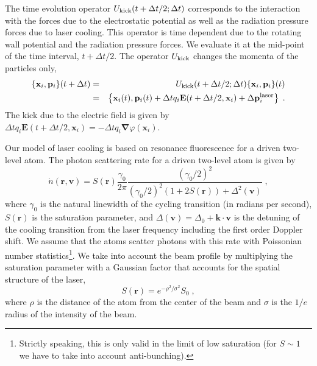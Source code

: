 \documentclass[aps, pra, twocolumn]{revtex4-1}
\begin{document}
The time evolution operator $U_{\rm kick}(t + \Delta t/2; \Delta
t)$ corresponds to the interaction with the forces due to the
electrostatic potential as well as the radiation pressure forces
due to laser cooling. This operator is time dependent due to the
rotating wall potential and the radiation pressure forces. We
evaluate it at the mid-point of the time interval, $t + \Delta t
/ 2$. The operator $U_{\rm kick}$ changes the momenta of the
particles only,
\begin{eqnarray}
  \{\mathbf{x}_i, \mathbf{p}_i\}(t + \Delta t)
  &=& U_{\rm kick}(t + \Delta t /2; \Delta t)
    \{\mathbf{x}_i, \mathbf{p}_i\}(t)\\
  &=&\left\{
      \mathbf{x}_i(t),
      \mathbf{p}_i(t) +
      \Delta t q_i \mathbf{E}(t + \Delta t / 2, \mathbf{x}_i) +
      \Delta \mathbf{p}_i^{\rm laser}
      \right\}\;.
\end{eqnarray}
The kick due to the electric field is given by $\Delta t
q_i\mathbf{E}(t+\Delta t /2,\mathbf{x}_i) = -\Delta t
q_i\mathbf{\nabla}\varphi(\mathbf{x}_i)$.

Our model of laser cooling is based on resonance fluorescence for
a driven two-level atom. The photon scattering rate for a driven
two-level atom is given by
\begin{equation}
\dot n (\mathbf{r}, \mathbf{v}) = 
S(\mathbf{r})\frac{\gamma_0}{2\pi}
\frac{(\gamma_0/2)^2}{(\gamma_0/2)^2(1+2S(\mathbf{r}))+\Delta^2(\mathbf{v})}\;,
\end{equation}
where $\gamma_0$ is the natural linewidth of the cycling transition (in
radians per second), $S(\mathbf{r})$ is the saturation parameter, and
$\Delta(\mathbf{v})=\Delta_0 + \mathbf{k}\cdot\mathbf{v}$ is the
detuning of the cooling transition from the laser frequency including
the first order Doppler shift.  We assume that the atoms scatter photons
with this rate with Poissonian number statistics\footnote{Strictly
speaking, this is only valid in the limit of low saturation (for
$S\sim 1$ we have to take into account anti-bunching).}.  We take into
account the beam profile by multiplying the saturation parameter with a
Gaussian factor that accounts for the spatial structure of the laser,
\begin{equation}
S(\mathbf{r})=e^{-\rho^2/\sigma^2}S_0\;,
\end{equation}
where $\rho$ is the distance of the atom from the center of the beam and
$\sigma$ is the $1/e$ radius of the intensity of the beam.
\end{document}
